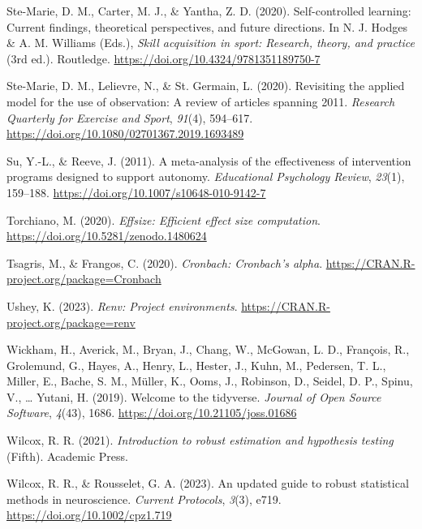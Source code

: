 \documentclass[
  man, donotrepeattitle,mask,floatsintext]{apa7}
\newlength{\cslhangindent}
\newlength{\cslentryspacingunit} %
\newenvironment{CSLReferences}[2] %
 {%
  \setlength{\parindent}{0pt}
  \ifodd #1
  \let\oldpar\par
  \def\par{\hangindent=\cslhangindent\oldpar}
  \fi
  \setlength{\parskip}{#2\cslentryspacingunit}
 }%
 {}
\begin{document}
\begin{CSLReferences}{1}{0}
\leavevmode{}%
Ste-Marie, D. M., Carter, M. J., \& Yantha, Z. D. (2020). Self-controlled learning: {Current} findings, theoretical perspectives, and future directions. In N. J. Hodges \& A. M. Williams (Eds.), \emph{Skill acquisition in sport: {Research}, theory, and practice} (3rd ed.). Routledge. \url{https://doi.org/10.4324/9781351189750-7}

\leavevmode{}%
Ste-Marie, D. M., Lelievre, N., \& St. Germain, L. (2020). Revisiting the applied model for the use of observation: {A} review of articles spanning 2011. \emph{Research Quarterly for Exercise and Sport}, \emph{91}(4), 594--617. \url{https://doi.org/10.1080/02701367.2019.1693489}

\leavevmode{}%
Su, Y.-L., \& Reeve, J. (2011). A meta-analysis of the effectiveness of intervention programs designed to support autonomy. \emph{Educational Psychology Review}, \emph{23}(1), 159--188. \url{https://doi.org/10.1007/s10648-010-9142-7}

\leavevmode{}%
Torchiano, M. (2020). \emph{Effsize: Efficient effect size computation}. \url{https://doi.org/10.5281/zenodo.1480624}

\leavevmode{}%
Tsagris, M., \& Frangos, C. (2020). \emph{Cronbach: Cronbach's alpha}. \url{https://CRAN.R-project.org/package=Cronbach}

\leavevmode{}%
Ushey, K. (2023). \emph{Renv: Project environments}. \url{https://CRAN.R-project.org/package=renv}

\leavevmode{}%
Wickham, H., Averick, M., Bryan, J., Chang, W., McGowan, L. D., François, R., Grolemund, G., Hayes, A., Henry, L., Hester, J., Kuhn, M., Pedersen, T. L., Miller, E., Bache, S. M., Müller, K., Ooms, J., Robinson, D., Seidel, D. P., Spinu, V., \ldots{} Yutani, H. (2019). Welcome to the {tidyverse}. \emph{Journal of Open Source Software}, \emph{4}(43), 1686. \url{https://doi.org/10.21105/joss.01686}

\leavevmode{}%
Wilcox, R. R. (2021). \emph{Introduction to robust estimation and hypothesis testing} (Fifth). {Academic Press}.

\leavevmode{}%
Wilcox, R. R., \& Rousselet, G. A. (2023). An updated guide to robust statistical methods in neuroscience. \emph{Current Protocols}, \emph{3}(3), e719. \url{https://doi.org/10.1002/cpz1.719}


\end{CSLReferences}
\end{document}
